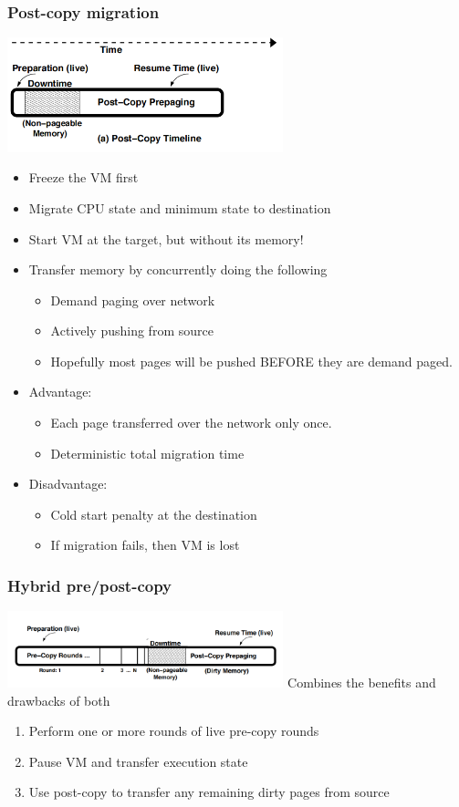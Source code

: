 \documentclass[12pt]{article}
\begin{document}
\subsubsection{Post-copy migration}
\includegraphics[width=0.6\textwidth]{Post-copyMigration.png}
\begin{itemize}
    \item Freeze the VM first
    \item Migrate CPU state and minimum state to destination
    \item Start VM at the target, but without its memory!
    \item Transfer memory by concurrently doing the following \begin{itemize}
        \item Demand paging over network
        \item Actively pushing from source
        \item Hopefully most pages will be pushed BEFORE they are demand paged.
    \end{itemize}
    \item Advantage: \begin{itemize}
        \item Each page transferred over the network only once.
        \item Deterministic total migration time
    \end{itemize}
    \item Disadvantage: \begin{itemize}
        \item Cold start penalty at the destination
        \item If migration fails, then VM is lost
    \end{itemize}
\end{itemize}
\subsubsection{Hybrid pre/post-copy}
\includegraphics[width=0.6\textwidth]{HybridPreAndPost-copy.png}
Combines the benefits and drawbacks of both
\begin{enumerate}
    \item Perform one or more rounds of live pre-copy rounds
    \item Pause VM and transfer execution state
    \item Use post-copy to transfer any remaining dirty pages from source
\end{enumerate}
\end{document}

